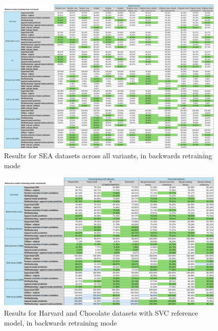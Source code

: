 \documentclass{svproc}
\begin{document}
 \begin{figure}
 	\centering
 	\includegraphics[scale=.95]{figures/Fig26_SEA_1.png}
 	\caption{Results for SEA datasets across all variants, in backwards retraining mode}
 	\label{fig:fig26}
 \end{figure}
 
 \begin{figure}
 	\centering
 	\includegraphics[scale=.95]{figures/Fig27_SVC_1.png}
 	\caption{Results for Harvard and Chocolate datasets with SVC reference model, in backwards retraining mode}
 	\label{fig:fig27}
 \end{figure}
 
\end{document}
